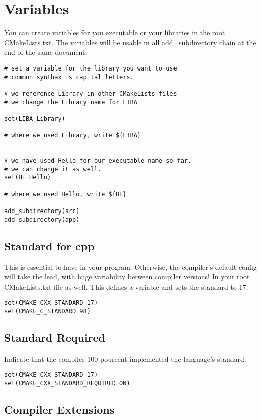\section{Variables}

You can create variables for you executable or your libraries in the root CMakeLists.txt. The variables
will be usable in all add\_subdirectory chain at the end of the same document.

\begin{verbatim}
# set a variable for the library you want to use
# common synthax is capital letters.

# we reference Library in other CMakeLists files
# we change the Library name for LIBA

set(LIBA Library)

# where we used Library, write ${LIBA}


# we have used Hello for our executable name so far.
# we can change it as well.
set(HE Hello)

# where we used Hello, write ${HE}

add_subdirectory(src)
add_subdirectory(app)
\end{verbatim}


\subsection{Standard for cpp}

This is essential to have in your program. Otherwise, the compiler's default config will take the lead, with huge
variability between compiler versions!
In your root CMakeLists.txt file as well. This defines a variable and sets the standard to 17.

\begin{verbatim}
set(CMAKE_CXX_STANDARD 17)
set(CMAKE_C_STANDARD 98)
\end{verbatim}

\subsection{Standard Required}

Indicate that the compiler 100 pourcent implemented the language's standard.

\begin{verbatim}
set(CMAKE_CXX_STANDARD 17)
set(CMAKE_CXX_STANDARD_REQUIRED ON)
\end{verbatim}

\subsection{Compiler Extensions}

